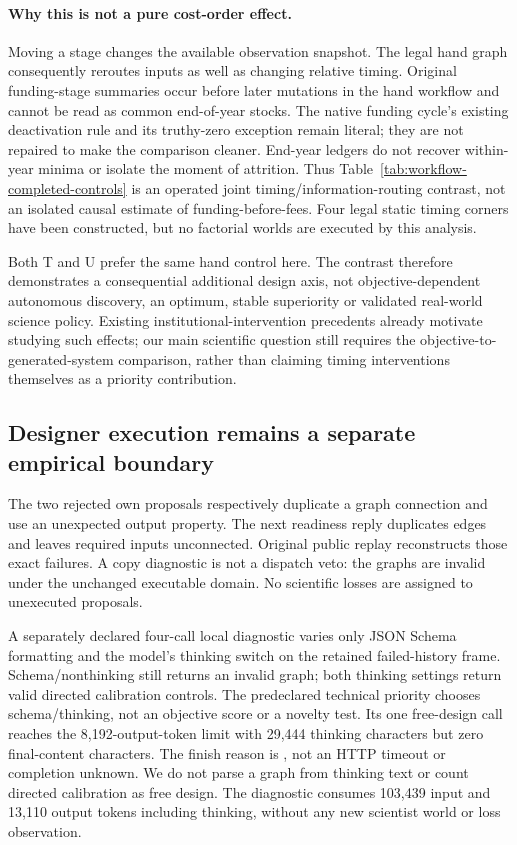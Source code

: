 \paragraph{Why this is not a pure cost-order effect.}
Moving a stage changes the available observation snapshot. The legal hand
graph consequently reroutes inputs as well as changing relative timing.
Original funding-stage summaries occur before later mutations in the hand
workflow and cannot be read as common end-of-year stocks. The native funding
cycle's existing deactivation rule and its truthy-zero exception remain
literal; they are not repaired to make the comparison cleaner. End-year
ledgers do not recover within-year minima or isolate the moment of attrition.
Thus Table~\ref{tab:workflow-completed-controls} is an operated joint
timing/information-routing contrast, not an isolated causal estimate of
funding-before-fees. Four legal static timing corners have been constructed,
but no factorial worlds are executed by this analysis.

Both T and U prefer the same hand control here. The contrast therefore
demonstrates a consequential additional design axis, not objective-dependent
autonomous discovery, an optimum, stable superiority or validated real-world
science policy. Existing institutional-intervention precedents already
motivate studying such effects; our main scientific question still requires
the objective-to-generated-system comparison, rather than claiming timing
interventions themselves as a priority contribution.

\subsection{Designer execution remains a separate empirical boundary}
The two rejected own proposals respectively duplicate a graph connection and
use an unexpected output property. The next readiness reply duplicates edges
and leaves required inputs unconnected. Original public replay reconstructs
those exact failures. A copy diagnostic is not a dispatch veto: the graphs
are invalid under the unchanged executable domain. No scientific losses are
assigned to unexecuted proposals.

A separately declared four-call local diagnostic varies only JSON Schema
formatting and the model's thinking switch on the retained failed-history
frame. Schema/nonthinking still returns an invalid graph; both thinking
settings return valid directed calibration controls. The predeclared
technical priority chooses schema/thinking, not an objective score or a
novelty test. Its one free-design call reaches the 8,192-output-token limit
with 29,444 thinking characters but zero final-content characters. The finish
reason is , not an HTTP timeout or completion unknown. We do not
parse a graph from thinking text or count directed calibration as free design.
The diagnostic consumes 103,439 input and 13,110 output tokens including
thinking, without any new scientist world or loss observation.

